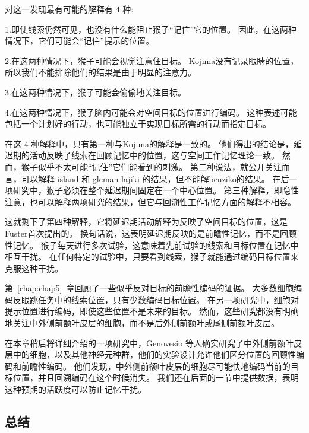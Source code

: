 对这一发现最有可能的解释有 4 种:
\par


1.即使线索仍然可见，也没有什么能阻止猴子“记住”它的位置。
因此，在这两种情况下，它们可能会“记住”提示的位置。
\par


2.在这两种情况下，猴子可能会视觉注意住目标。
Kojima\cite{kojima1984functional}没有记录眼睛的位置，所以我们不能排除他们的结果是由于明显的注意力。
\par


3.在这两种情况下，猴子可能会偷偷地关注目标。
\par


4.在这两种情况下，猴子脑内可能会对空间目标的位置进行编码。
这种表述可能包括一个计划好的行动，也可能独立于实现目标所需的行动而指定目标。


在这 4 种解释中，只有第一种与Kojima\cite{kojima1984functional}的解释是一致的。
他们得出的结论是，延迟期的活动反映了线索在回顾记忆中的位置，这与空间工作记忆理论一致。
然而，猴子似乎不太可能“记住”它们能看到的刺激。
第二种说法，就公开关注而言，可以解释 island 和 gleman-lajiki 的结果，但不能解benziko的结果。
在后一项研究中，猴子必须在整个延迟期间固定在一个中心位置。
第三种解释，即隐性注意，也可以解释两项研究的结果，但它与回溯性工作记忆方面的解释不相容。


这就剩下了第四种解释，它将延迟期活动解释为反映了空间目标的位置，这是 Fuster\cite{fuster1973unit}首次提出的。
换句话说，这表明延迟期反映的是前瞻性记忆，而不是回顾性记忆。
猴子每天进行多次试验，这意味着先前试验的线索和目标位置在记忆中相互干扰。
在任何特定的试验中，只要看到线索，猴子就能通过编码目标位置来克服这种干扰。


第~\ref{chap:chap5}~章回顾了一些似乎反对目标的前瞻性编码的证据。
大多数细胞编码反眼跳任务中的线索位置，只有少数编码目标位置。
在另一项研究中，细胞对提示位置进行编码，即使这些位置不是未来的目标。
然而，这些研究都没有明确地关注中外侧前额叶皮层的细胞，而不是后外侧前额叶或尾侧前额叶皮层。


在本章稍后将详细介绍的一项研究中，Genovesio 等人\cite{genovesio2006representation}确实研究了中外侧前额叶皮层中的细胞，以及其他神经元种群，他们的实验设计允许他们区分位置的回顾性编码和前瞻性编码。
他们发现，中外侧前额叶皮层的细胞尽可能快地编码当前的目标位置，并且回溯编码在这个时候消失。
我们还在后面的一节中提供数据，表明这种预期的活跃度可以防止记忆干扰\cite{sakai2002active}。



\subsection{总结}

